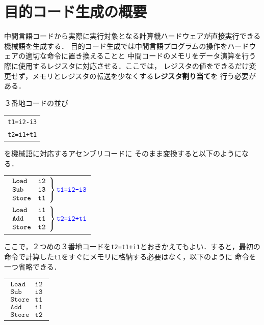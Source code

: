 \documentclass[dvipdfmx,a4j]{jbook}
\begin{document}
\section{目的コード生成の概要}

中間言語コードから実際に実行対象となる計算機ハードウェアが直接実行できる機械語を生成する．
目的コード生成では中間言語プログラムの操作をハードウェアの適切な命令に置き換えることと
中間コードのメモリをデータ演算を行う際に使用するレジスタに対応させる．ここでは，
レジスタの値をできるだけ変更せず，メモリとレジスタの転送を少なくする{\bf レジスタ割り当て}を
行う必要がある．

３番地コードの並び

\begin{center}
\begin{tabular}{l}
\verb|t1=i2-i3|\\
\verb|t2=i1+t1|
\end{tabular}
\end{center}

を機械語に対応するアセンブリコードに
そのまま変換すると以下のようになる．

\begin{center}
  \begin{tabular}{l}
    $\left .\begin{array}{ll}
      \texttt{Load}  & \texttt{i2}\\
      \texttt{Sub}   & \texttt{i3}\\
      \texttt{Store} & \texttt{t1}
    \end{array}\right\}
    {\color{blue}\texttt{t1=i2-i3}}$\\
    $\left .\begin{array}{ll}
      \texttt{Load} & \texttt{i1}\\
      \texttt{Add} & \texttt{t1}\\
      \texttt{Store} & \texttt{t2}
    \end{array}\right\}
    {\color{blue}\texttt{t2=i2+t1}}$\\
  \end{tabular}
\end{center}

ここで，２つめの３番地コードを\verb|t2=t1+i1|とおきかえてもよい．すると，最初の
命令で計算した\verb|t1|をすぐにメモリに格納する必要はなく，以下のように
命令を一つ省略できる．

\begin{center}
  \begin{tabular}{l}
    $\begin{array}{ll}
      \texttt{Load}  & \texttt{i2}\\
      \texttt{Sub}   & \texttt{i3}\\
      \texttt{Store} & \texttt{t1}\\
      \texttt{Add} & \texttt{i1}\\
      \texttt{Store} & \texttt{t2}
    \end{array}$\\
  \end{tabular}
\end{center}
\end{document}
